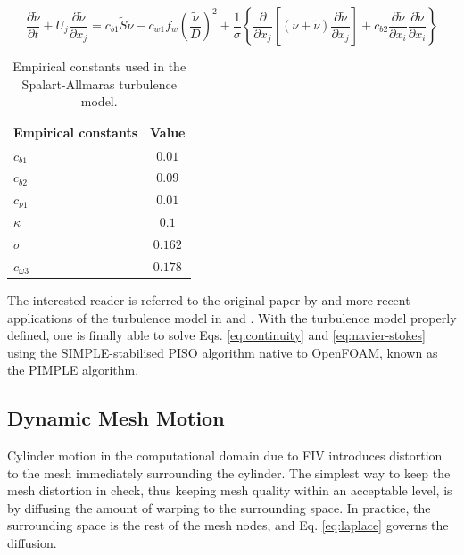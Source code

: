 \documentclass[oneside]{utmthesis}
\begin{document}
\begin{equation}
  \label{eq:kineticEddyTransport}
  \frac{\partial \tilde{\nu}}{\partial t} + U_{j} \frac{\partial \tilde{\nu}}{\partial x_{j}} = c_{b1}\tilde{S}\tilde{\nu} - c_{w1} f_{w} \left( \frac{\tilde{\nu}}{D} \right)^{2} + \frac{1}{\sigma} \left\{ \frac{\partial}{\partial x_{j}} \left[ \left( \nu + \tilde{\nu} \right) \frac{\partial \tilde{\nu}}{\partial x_{j}} \right] + c_{b2} \frac{\partial \tilde{\nu}}{\partial x_{i}} \frac{\partial \tilde{\nu}}{\partial x_{i}} \right\}
\end{equation}

\begin{table}[!ht]
\centering
\caption{Empirical constants used in the Spalart-Allmaras turbulence model.} \label{tab:spalart-Allmaras}
\vspace{\baselineskip}
\begin{tabular}{l c}
  \hline
  \hline

  Empirical constants & Value    \\
  \hline

  $c_{b1}$            & $0.01$   \\
  $c_{b2}$            & $0.09$   \\
  $c_{\nu1}$          & $0.01$   \\
  $\kappa$            & $0.1$    \\
  $\sigma$            & $0.162$  \\
  $c_{\omega3}$       & $0.178$  \\
  \hline
  \hline
\end{tabular}
\end{table}

\noindent The interested reader is referred to the original paper by \citet{Spalart1992} and more recent applications of the turbulence model in \citet{Ding2019} and \citet{Sun2019b}. With the turbulence model properly defined, one is finally able to solve Eqs. \ref{eq:continuity} and \ref{eq:navier-stokes} using the SIMPLE-stabilised PISO algorithm native to OpenFOAM, known as the PIMPLE algorithm.

\subsection{Dynamic Mesh Motion} \label{ssec:dynMesh}

Cylinder motion in the computational domain due to FIV introduces distortion to the mesh immediately surrounding the cylinder. The simplest way to keep the mesh distortion in check, thus keeping mesh quality within an acceptable level, is by diffusing the amount of warping to the surrounding space. In practice, the surrounding space is the rest of the mesh nodes, and Eq. \ref{eq:laplace} governs the diffusion.
\end{document}
